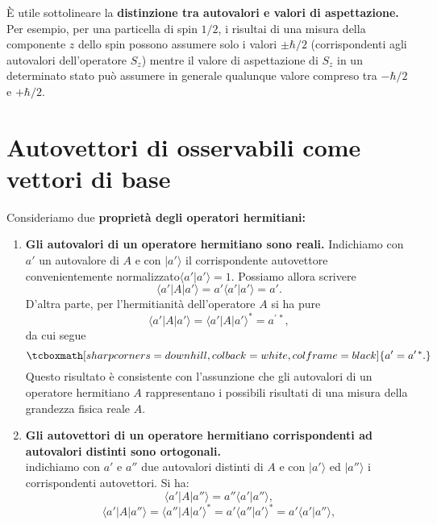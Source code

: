 \documentclass[a4paper,12pt,oneside]{book}
\begin{document}
È utile sottolineare la \textbf{distinzione tra autovalori e valori di aspettazione.} Per esempio, per una particella di spin $1/2$, i risultai di una misura della componente $z$ dello spin possono assumere solo i valori $\pm \hbar/2$ (corrispondenti agli autovalori dell'operatore $S_z$) mentre il valore di aspettazione di $S_z$ in un determinato stato può assumere in generale qualunque valore compreso tra $-\hbar /2$ e $+\hbar /2$.
\section{Autovettori di osservabili come vettori di base}
Consideriamo due \textbf{proprietà degli operatori hermitiani:}
\begin{enumerate}
\item \textbf{Gli autovalori di un operatore hermitiano sono reali.} Indichiamo con $a'$ un autovalore di $A$ e con $\vert a' \rangle $ il corrispondente autovettore convenientemente normalizzato$\langle a' \vert a' \rangle =1 $. Possiamo allora scrivere
	\begin{equation}
		\langle a' \vert A \vert a' \rangle = a' \langle a' \vert a' \rangle = a'.
	\end{equation}
D'altra parte, per l'hermitianità dell'operatore $A$ si ha pure
	\begin{equation}
		\langle a' \vert A \vert a' \rangle = \langle a' \vert A \vert a' \rangle  ^* = a^{\prime \, *},
	\end{equation}
da cui segue
	\begin{equation}
		\tcboxmath[sharp corners=downhill, colback=white, colframe=black]{
			a'=a^{\prime \, *} .
			}
	\end{equation}
Questo risultato è consistente con l'assunzione che gli autovalori di un operatore hermitiano $A$ rappresentano i possibili risultati di una misura della grandezza fisica reale $A$.
\item \textbf{Gli autovettori di un operatore hermitiano corrispondenti ad autovalori distinti sono ortogonali.}\\
indichiamo con $a' $ e $a''$ due autovalori distinti di $A$ e con $\vert a' \rangle$ ed $\vert a'' \rangle$ i corrispondenti autovettori. Si ha:
	\begin{equation}
		\langle a' \vert A \vert a'' \rangle = a'' \langle a' \vert a'' \rangle ,
	\end{equation}
	\begin{equation}
		\langle a' \vert A \vert a'' \rangle = \langle a'' \vert A \vert a' \rangle ^* = a' \langle a'' \vert a' \rangle ^* = a' \langle a' \vert a'' \rangle ,

\end{equation}
\end{enumerate}
\end{document}
